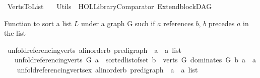 %
\begin{isabellebody}%
%
%
\isadelimtheory
%
\endisadelimtheory
%
\isatagtheory
{}\isamarkupfalse%
\ Verts{\isacharunderscore}{\kern0pt}To{\isacharunderscore}{\kern0pt}List\isanewline
\ \ \ Utils\ \ {\isachardoublequoteopen}HOL{\isacharminus}{\kern0pt}Library{\isachardot}{\kern0pt}Comparator{\isachardoublequoteclose}\ Extend{\isacharunderscore}{\kern0pt}blockDAG\isanewline
{}%
\endisatagtheory
{\isafoldtheory}%
%
\isadelimtheory
%
\endisadelimtheory
%
\begin{isamarkuptext}%
Function to sort a list $L$ under a graph G such if $a$ references $b$,
$b$ precedes $a$ in the list%
\end{isamarkuptext}\isamarkuptrue%
\isamarkupfalse%
\ unfold{\isacharunderscore}{\kern0pt}referencing{\isacharunderscore}{\kern0pt}verts{\isacharcolon}{\kern0pt}{\isacharcolon}{\kern0pt}\ {\isachardoublequoteopen}{\isacharparenleft}{\kern0pt}{\isacharprime}{\kern0pt}a{\isacharcolon}{\kern0pt}{\isacharcolon}{\kern0pt}linorder{\isacharcomma}{\kern0pt}{\isacharprime}{\kern0pt}b{\isacharparenright}{\kern0pt}\ pre{\isacharunderscore}{\kern0pt}digraph\ {\isasymRightarrow}\ {\isacharprime}{\kern0pt}a\ {\isasymRightarrow}\ {\isacharprime}{\kern0pt}a\ list{\isachardoublequoteclose}\ \isanewline
\ \ \ {\isachardoublequoteopen}unfold{\isacharunderscore}{\kern0pt}referencing{\isacharunderscore}{\kern0pt}verts\ G\ a\ {\isacharequal}{\kern0pt}\ sorted{\isacharunderscore}{\kern0pt}list{\isacharunderscore}{\kern0pt}of{\isacharunderscore}{\kern0pt}set\ {\isacharparenleft}{\kern0pt}{\isacharbraceleft}{\kern0pt}b\ {\isasymin}\ verts\ G{\isachardot}{\kern0pt}\ dominates\ G\ b\ a{\isacharbraceright}{\kern0pt}\ {\isasymunion}\ {\isacharbraceleft}{\kern0pt}a{\isacharbraceright}{\kern0pt}{\isacharparenright}{\kern0pt}{\isachardoublequoteclose}\ \ \isanewline
\isanewline
\isanewline
{}\isamarkupfalse%
\ unfold{\isacharunderscore}{\kern0pt}referencing{\isacharunderscore}{\kern0pt}verts{\isacharunderscore}{\kern0pt}ex{\isacharcolon}{\kern0pt}{\isacharcolon}{\kern0pt}\ {\isachardoublequoteopen}{\isacharparenleft}{\kern0pt}{\isacharprime}{\kern0pt}a{\isacharcolon}{\kern0pt}{\isacharcolon}{\kern0pt}linorder{\isacharcomma}{\kern0pt}{\isacharprime}{\kern0pt}b{\isacharparenright}{\kern0pt}\ pre{\isacharunderscore}{\kern0pt}digraph\ {\isasymRightarrow}\ {\isacharprime}{\kern0pt}a\ {\isasymRightarrow}\ {\isacharprime}{\kern0pt}a\ list{\isachardoublequoteclose}\ \isanewline

\end{isabellebody}

